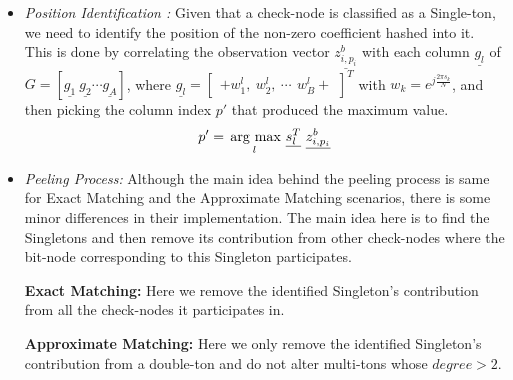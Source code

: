 \begin{enumerate}
\begin{itemize}
 \item \textit{Position Identification :} Given that a check-node is classified as a Single-ton, we need to identify the position of the non-zero coefficient  hashed into it. This is done by correlating the observation vector $\underline{z^{b}_{i,p_i}}$ with each column $\underline{g_l}$ of  $G = [\underline{g_1} \ \underline{g_2} \cdots \underline{g_A}]$, where $\underline{g_l} =\begin{bmatrix}
+			 w_1^{l}, ~ w_2^{l}, ~ \cdots\, ~ w_B^{l}
+			 \end{bmatrix}^{T}$ with $w_k = e^{j \frac{2\pi s_k}{N}}$,  and then picking the column index  $p'$ that produced the maximum value.
\[ p' = \underset{l}{\operatorname*{\,arg\ max}}\  \underline{s^T_l} ~ \underline{z^{b}_{i,p_i}}\]
			 
			 \item \textit{Peeling Process: } Although the main idea behind the peeling process is same for Exact Matching and the Approximate Matching scenarios, there is some minor differences in their implementation. The main idea here is to find the Singletons and then remove its contribution from other check-nodes where the bit-node corresponding to this Singleton participates.
			 
			 
			  {\bf Exact Matching:} Here we remove the identified Singleton's contribution from all the check-nodes it participates in.
			  
			  {\bf Approximate Matching:} Here we only remove the identified Singleton's contribution from a double-ton and do not alter multi-tons whose $degree > 2$.
			  		 
		 \end{itemize} 
	 
	 
\end{enumerate}
